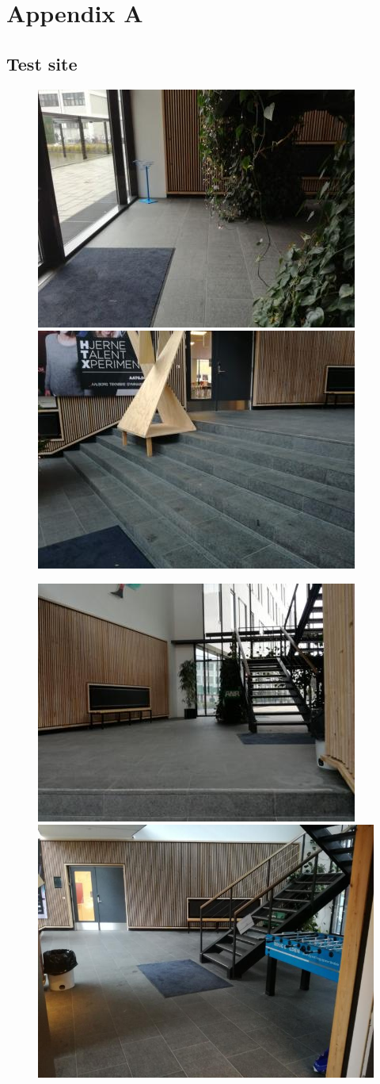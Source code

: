\chapter{Appendix A}
\section{Test site}

\begin{figure}[hp!]
    \centering
    \includegraphics[width=.45\textwidth]{figures/testarea1.jpg}\label{fig:testsite1} 
    \includegraphics[width=.45\textwidth]{figures/testarea2.jpg}\label{fig:testsite2} 
\end{figure}

\begin{figure}[hp!]
    \centering
     \includegraphics[width=.45\textwidth]{figures/testarea3.jpg}\label{fig:testsite3} 
    \includegraphics[width=.45\textwidth]{figures/testarea4.jpg}\label{fig:testsite4} 
\end{figure}


